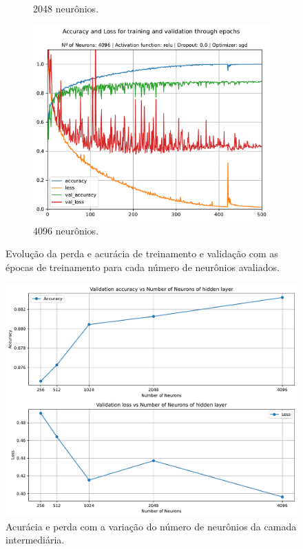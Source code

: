\begin{figure}[H]
\begin{subfigure}[H]{0.49\textwidth}
		\caption{2048 neurônios.}
		\label{fig:mlp_2048_relu_0.0_sgd}
	\end{subfigure}
	\begin{subfigure}[H]{0.49\textwidth}
		\centering
		\includegraphics[width = \textwidth]{../../plot/mlp/mlp_4096_relu_0.0_sgd}
		\caption{4096 neurônios.}
		\label{fig:mlp_4096_relu_0.0_sgd}
	\end{subfigure}
	\caption{Evolução da perda e acurácia de treinamento e validação com as épocas de treinamento para cada número de neurônios avaliados.}
\end{figure}


\begin{figure}[H]
	\centering
	\includegraphics[width=0.75\linewidth]{../../plot/mlp/search_neurons}
	\caption{Acurácia e perda com a variação do número de neurônios da camada intermediária.}
	\label{fig:search_neurons}
\end{figure}

